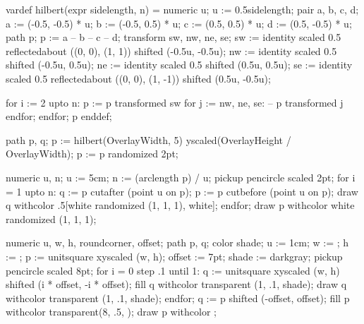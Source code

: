 \setupinteraction[
  title={ConTeXt 蹊径},
  author={李延瑞 (lyr.m2@live.cn)},
  keyword={TeX, ConTeXt MkIV, ConTeXt LMTX, LuaTeX, LuaMetaTeX}
]

\startMPinclusions[+]
vardef hilbert(expr sidelength, n) = 
  numeric u; u := 0.5sidelength;
  pair a, b, c, d;
  a := (-0.5, -0.5) * u;
  b := (-0.5, 0.5) * u;
  c := (0.5, 0.5) * u;
  d := (0.5, -0.5) * u;
  path p; 
  p := a -- b -- c -- d;
  transform sw, nw, ne, se;
  sw := identity
        scaled 0.5
        reflectedabout ((0, 0), (1, 1))
        shifted (-0.5u, -0.5u);
  nw := identity
        scaled 0.5
        shifted (-0.5u, 0.5u);
  ne := identity
        scaled 0.5
        shifted (0.5u, 0.5u);
  se := identity
        scaled 0.5
        reflectedabout ((0, 0), (1, -1))
        shifted (0.5u, -0.5u);

  for i := 2 upto n:
    p := p transformed sw for j := nw, ne, se: -- p transformed j endfor;
  endfor;
  p
enddef;
\stopMPinclusions

path p, q;
p := hilbert(OverlayWidth, 5) yscaled(OverlayHeight / OverlayWidth);
p := p randomized 2pt;

numeric u, n; u := 5cm; n := (arclength p) / u;
pickup pencircle scaled 2pt;
for i = 1 upto n:
  q := p cutafter (point u on p);
  p := p cutbefore (point u on p);
  draw q withcolor .5[white randomized (1, 1, 1), white];
endfor;
draw p withcolor white randomized (1, 1, 1);
\stopuseMPgraphic
{}

numeric u, w, h, roundcorner, offset;
path p, q;
color shade;
u := 1cm; w := \overlaywidth; h := \overlayheight;
p := unitsquare xyscaled (w, h);
offset := 7pt;
shade := darkgray;
pickup pencircle scaled 8pt;
for i = 0 step .1 until 1:
    q := unitsquare xyscaled (w, h) shifted (i * offset, -i * offset);
    fill q withcolor transparent (1, .1, shade);
    draw q withcolor transparent (1, .1, shade);
endfor;
q := p shifted (-offset, offset);
fill p withcolor transparent(8, .5, );
draw p withcolor ;
\stopuniqueMPgraphic
{}


\setupbackgrounds[page][background=TitleGraphic]
\startstandardmakeup
\hfil
  \startcolor[yellow]
  \stopcolor
  \hfil
  \blank[14cm]
\stopstandardmakeup
\setupbackgrounds[page][background=]
